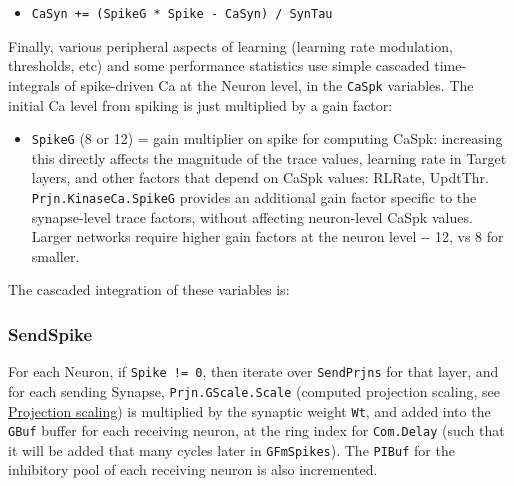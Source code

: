 \documentclass[11pt,twoside]{article}
\newif\myifpdf
\begin{document}
\begin{itemize}
\tightlist
\item
  \texttt{CaSyn\ +=\ (SpikeG\ *\ Spike\ -\ CaSyn)\ /\ SynTau}
\end{itemize}

Finally, various peripheral aspects of learning (learning rate
modulation, thresholds, etc) and some performance statistics use simple
cascaded time-integrals of spike-driven Ca at the Neuron level, in the
\texttt{CaSpk} variables. The initial Ca level from spiking is just
multiplied by a gain factor:

\begin{itemize}
\tightlist
\item
  \texttt{SpikeG} (8 or 12) = gain multiplier on spike for computing
  CaSpk: increasing this directly affects the magnitude of the trace
  values, learning rate in Target layers, and other factors that depend
  on CaSpk values: RLRate, UpdtThr. \texttt{Prjn.KinaseCa.SpikeG}
  provides an additional gain factor specific to the synapse-level trace
  factors, without affecting neuron-level CaSpk values. Larger networks
  require higher gain factors at the neuron level -\/- 12, vs 8 for
  smaller.
\end{itemize}

The cascaded integration of these variables is:

\begin{Shaded}
\begin{Highlighting}[]
\OperatorTok{+=} \OperatorTok{(}\OperatorTok{*}\OperatorTok{{-}}\OperatorTok{)} \OperatorTok{/}
\OperatorTok{+=} \OperatorTok{(}\OperatorTok{{-}}\OperatorTok{)} \OperatorTok{/}
\OperatorTok{+=} \OperatorTok{(}\OperatorTok{{-}}\OperatorTok{)} \OperatorTok{/}
\end{Highlighting}
\end{Shaded}

\hypertarget{sendspike}{%
\subsubsection{SendSpike}\label{sendspike}}

For each Neuron, if \texttt{Spike\ !=\ 0}, then iterate over
\texttt{SendPrjns} for that layer, and for each sending Synapse,
\texttt{Prjn.GScale.Scale} (computed projection scaling, see
\protect\hyperlink{projection-scaling}{Projection scaling}) is
multiplied by the synaptic weight \texttt{Wt}, and added into the
\texttt{GBuf} buffer for each receiving neuron, at the ring index for
\texttt{Com.Delay} (such that it will be added that many cycles later in
\texttt{GFmSpikes}). The \texttt{PIBuf} for the inhibitory pool of each
receiving neuron is also incremented.
\end{document}
